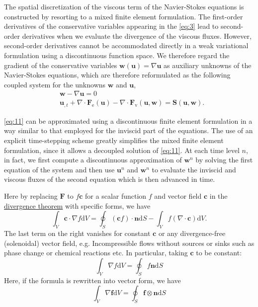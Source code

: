 \documentclass{develop-note}
\begin{document}
The spatial discretization of the viscous term of the Navier-Stokes equations is constructed by resorting to a mixed finite element formulation. The first-order derivatives of the conservative variables appearing in the \autoref{eq:3} lead to second-order derivatives when we evaluate the divergence of the viscous fluxes. However, second-order derivatives cannot be accommodated directly in a weak variational formulation using a discontinuous function space. We therefore regard the gradient of the conservative variables $\mathbf{w}(\mathbf{u})=\nabla\mathbf{u}$ as auxiliary unknowns of the Navier-Stokes equations, which are therefore reformulated as the following coupled system for the unknowns $\mathbf{w}$ and $\mathbf{u}$,
\begin{equation}
  \label{eq:11}
  \begin{aligned}
    &\mathbf{w}-\nabla\mathbf{u}=0\\
    &\mathbf{u}_{,t}+\nabla\cdot\mathbf{F}_{\mathrm{e}}(\mathbf{u})-\nabla\cdot\mathbf{F}_{\mathrm{v}}(\mathbf{u},\mathbf{w})=\mathbf{S}(\mathbf{u},\mathbf{w}).
  \end{aligned}
\end{equation}

\autoref{eq:11} can be approximated using a discontinuous finite element formulation in a way similar to that employed for the inviscid part of the equations. The use of an explicit time-stepping scheme greatly simplifies the mixed finite element formulation, since it allows a decoupled solution of \autoref{eq:11}. At each time level $n$, in fact, we first compute a discontinuous approximation of $\mathbf{w}^{n}$ by solving the first equation of the system and then use $\mathbf{u}^{n}$ and $\mathbf{w}^{n}$ to evaluate the inviscid and viscous fluxes of the second equation which is then advanced in time.

Here by replacing $\mathbf{F}$ to $f\mathbf{c}$ for a scalar function $f$ and vector field $\mathbf{c}$ in the \href{https://en.wikipedia.org/wiki/Divergence_theorem}{divergence theorem} with specific forms, we have
\begin{equation}
  \int_{V}\mathbf{c}\cdot\nabla f\mathrm{d}V=\oint_{S}(\mathbf{c}f)\cdot\mathbf{n}\mathrm{d}S-\int_{V}f(\nabla\cdot\mathbf{c})\mathrm{d}V.
\end{equation}
The last term on the right vanishes for constant $\mathbf{c}$ or any divergence-free (solenoidal) vector field, e.g. Incompressible flows without sources or sinks such as phase change or chemical reactions etc. In particular, taking
$\mathbf{c}$ to be constant:
\begin{equation}
  \int_{V}\nabla f\mathrm{d}V=\oint_{S}f\mathbf{n}\mathrm{d}S
\end{equation}
Here, if the formula is rewritten into vector form, we have
\begin{equation}
  \int_{V}\nabla\mathbf{f}\mathrm{d}V=\oint_{S}\mathbf{f}\otimes\mathbf{n}\mathrm{d}S
\end{equation}
\end{document}
